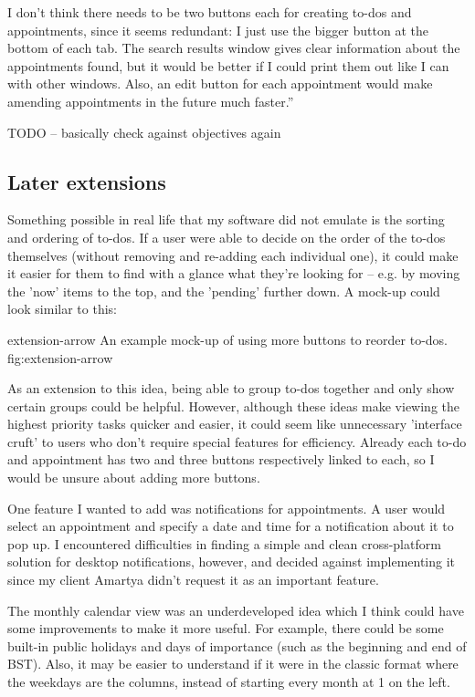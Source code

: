 I don't think there needs to be two buttons each for creating to-dos and
appointments, since it seems redundant: I just use the bigger button at the
bottom of each tab. The search results window gives clear information
about the appointments found, but it would be better if I could print them out
like I can with other windows. Also, an edit button for each appointment would
make amending appointments in the future much faster.''

TODO -- basically check against objectives again


\subsection{Later extensions}

Something possible in real life that my software did not emulate is the sorting
and ordering of to-dos. If a user were able to decide on the order of the to-dos
themselves (without removing and re-adding each individual one), it could make
it easier for them to find with a glance what they're looking for -- e.g. by
moving the 'now' items to the top, and the 'pending' further down. A mock-up
could look similar to this:

\addsmallfigure
    {extension-arrow}
    {An example mock-up of using more buttons to reorder to-dos.}
    {fig:extension-arrow}

As an extension to this idea, being able to group to-dos together and only show
certain groups could be helpful. However, although these ideas make viewing the
highest priority tasks quicker and easier, it could seem like unnecessary
'interface cruft' to users who don't require special features for efficiency.
Already each to-do and appointment has two and three buttons respectively linked
to each, so I would be unsure about adding more buttons.

One feature I wanted to add was notifications for appointments. A user would
select an appointment and specify a date and time for a notification about
it to pop up. I encountered difficulties in finding a simple and clean
cross-platform solution for desktop notifications, however, and decided against
implementing it since my client Amartya didn't request it as an important
feature.

The monthly calendar view was an underdeveloped idea which I think could have
some improvements to make it more useful. For example, there could be some
built-in public holidays and days of importance (such as the beginning and end
of BST). Also, it may be easier to understand if it were in the classic format
where the weekdays are the columns, instead of starting every month at 1 on the
left.
